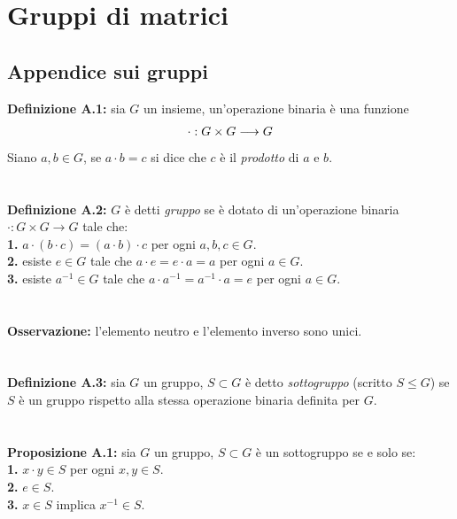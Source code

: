 \documentclass{article}
\begin{document}
\newpage
\section{Gruppi di matrici}
\subsection{Appendice sui gruppi}
\textbf{Definizione A.1:} sia $G$ un insieme, un'operazione binaria è una funzione
\begin{gather}
    \cdot : G \times G \longrightarrow G \notag
\end{gather}
Siano $a, b \in G$, se $a \cdot b = c$ si dice che $c$ è il \textit{prodotto} di $a$ e $b$. \\ \\ \\
\textbf{Definizione A.2:} $G$ è detti \textit{gruppo} se è dotato di un'operazione binaria \\ $\cdot : G \times G \longrightarrow G$ tale che: \\
\textbf{1.} $a \cdot (b \cdot c) = (a \cdot b) \cdot c$ per ogni $a, b, c \in G$. \\
\textbf{2.} esiste $e \in G$ tale che $a \cdot e = e \cdot a = a$ per ogni $a \in G$. \\
\textbf{3.} esiste $a^{-1} \in G$ tale che $a \cdot a^{-1} = a^{-1} \cdot a = e$ per ogni $a \in G$. \\ \\ \\
\textbf{Osservazione:} l'elemento neutro e l'elemento inverso sono unici. \\ \\ \\
\textbf{Definizione A.3:} sia $G$ un gruppo, $S \subset G$ è detto \textit{sottogruppo} (scritto $S \leq G$) se $S$ è un gruppo rispetto alla stessa operazione binaria definita per $G$. \\ \\ \\
\textbf{Proposizione A.1:} sia $G$ un gruppo, $S \subset G$ è un sottogruppo se e solo se: \\
\textbf{1.} $x \cdot y \in S$ per ogni $x, y \in S$. \\
\textbf{2.} $e \in S$. \\
\textbf{3.} $x \in S$ implica $x^{-1} \in S$. \\
\end{document}
